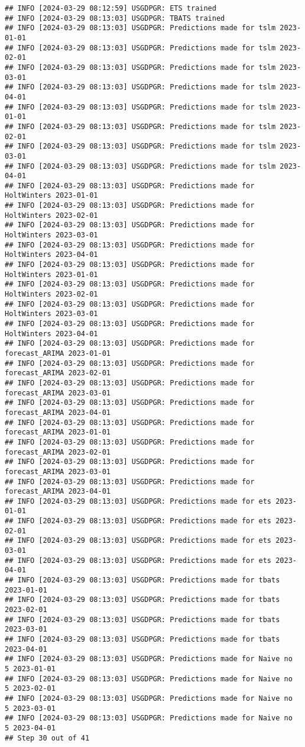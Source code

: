 \documentclass[
]{article}
\begin{document}
\begin{verbatim}
## INFO [2024-03-29 08:12:59] USGDPGR: ETS trained
## INFO [2024-03-29 08:13:03] USGDPGR: TBATS trained
## INFO [2024-03-29 08:13:03] USGDPGR: Predictions made for tslm 2023-01-01
## INFO [2024-03-29 08:13:03] USGDPGR: Predictions made for tslm 2023-02-01
## INFO [2024-03-29 08:13:03] USGDPGR: Predictions made for tslm 2023-03-01
## INFO [2024-03-29 08:13:03] USGDPGR: Predictions made for tslm 2023-04-01
## INFO [2024-03-29 08:13:03] USGDPGR: Predictions made for tslm 2023-01-01
## INFO [2024-03-29 08:13:03] USGDPGR: Predictions made for tslm 2023-02-01
## INFO [2024-03-29 08:13:03] USGDPGR: Predictions made for tslm 2023-03-01
## INFO [2024-03-29 08:13:03] USGDPGR: Predictions made for tslm 2023-04-01
## INFO [2024-03-29 08:13:03] USGDPGR: Predictions made for HoltWinters 2023-01-01
## INFO [2024-03-29 08:13:03] USGDPGR: Predictions made for HoltWinters 2023-02-01
## INFO [2024-03-29 08:13:03] USGDPGR: Predictions made for HoltWinters 2023-03-01
## INFO [2024-03-29 08:13:03] USGDPGR: Predictions made for HoltWinters 2023-04-01
## INFO [2024-03-29 08:13:03] USGDPGR: Predictions made for HoltWinters 2023-01-01
## INFO [2024-03-29 08:13:03] USGDPGR: Predictions made for HoltWinters 2023-02-01
## INFO [2024-03-29 08:13:03] USGDPGR: Predictions made for HoltWinters 2023-03-01
## INFO [2024-03-29 08:13:03] USGDPGR: Predictions made for HoltWinters 2023-04-01
## INFO [2024-03-29 08:13:03] USGDPGR: Predictions made for forecast_ARIMA 2023-01-01
## INFO [2024-03-29 08:13:03] USGDPGR: Predictions made for forecast_ARIMA 2023-02-01
## INFO [2024-03-29 08:13:03] USGDPGR: Predictions made for forecast_ARIMA 2023-03-01
## INFO [2024-03-29 08:13:03] USGDPGR: Predictions made for forecast_ARIMA 2023-04-01
## INFO [2024-03-29 08:13:03] USGDPGR: Predictions made for forecast_ARIMA 2023-01-01
## INFO [2024-03-29 08:13:03] USGDPGR: Predictions made for forecast_ARIMA 2023-02-01
## INFO [2024-03-29 08:13:03] USGDPGR: Predictions made for forecast_ARIMA 2023-03-01
## INFO [2024-03-29 08:13:03] USGDPGR: Predictions made for forecast_ARIMA 2023-04-01
## INFO [2024-03-29 08:13:03] USGDPGR: Predictions made for ets 2023-01-01
## INFO [2024-03-29 08:13:03] USGDPGR: Predictions made for ets 2023-02-01
## INFO [2024-03-29 08:13:03] USGDPGR: Predictions made for ets 2023-03-01
## INFO [2024-03-29 08:13:03] USGDPGR: Predictions made for ets 2023-04-01
## INFO [2024-03-29 08:13:03] USGDPGR: Predictions made for tbats 2023-01-01
## INFO [2024-03-29 08:13:03] USGDPGR: Predictions made for tbats 2023-02-01
## INFO [2024-03-29 08:13:03] USGDPGR: Predictions made for tbats 2023-03-01
## INFO [2024-03-29 08:13:03] USGDPGR: Predictions made for tbats 2023-04-01
## INFO [2024-03-29 08:13:03] USGDPGR: Predictions made for Naive no  5 2023-01-01
## INFO [2024-03-29 08:13:03] USGDPGR: Predictions made for Naive no  5 2023-02-01
## INFO [2024-03-29 08:13:03] USGDPGR: Predictions made for Naive no  5 2023-03-01
## INFO [2024-03-29 08:13:03] USGDPGR: Predictions made for Naive no  5 2023-04-01
## Step 30 out of 41
\end{verbatim}
\end{document}

